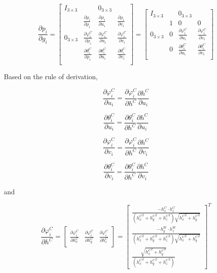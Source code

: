 \begin{equation}
\frac{\partial p_{i}}{\partial g_{i}}=\begin{bmatrix}
I_{3\times 3} & & 0_{3\times 3} & \\
 & \frac{\partial \rho_{i}}{\partial \rho_{i}} & 
\frac{\partial \rho_{i}}{\partial u_{i}} & 
\frac{\partial \rho _{i}}{\partial v_{i}}\\
0_{3\times 3} & \frac{\partial \varphi_{i}^{C}}{\partial \rho_{i}} & 
\frac{\partial \varphi_{i}^{C}}{\partial u_{i}} & 
\frac{\partial \varphi_{i}^{C}}{\partial v_{i}} \\
 & \frac{\partial \theta_{i}^{C}}{\partial \rho_{i}} & 
\frac{\partial \theta_{i}^{C}}{\partial u_{i}} & 
\frac{\partial \theta_{i}^{C}}{\partial v_{i}} \\
\end{bmatrix} = \begin{bmatrix}
I_{3\times 3} & & 0_{3\times 3} & \\
 & 1 & 0 & 0 \\
0_{3\times 3} & 0 & \frac{\partial \varphi _{i}^{C}}{\partial u_{i}} 
& \frac{\partial \varphi_{i}^{C}}{\partial v_{i}} \\
 & 0 & \frac{\partial \theta_{i}^{C}}{\partial u_{i}} & 
\frac{\partial \theta_{i}^{C}}{\partial v_{i}} \\
\end{bmatrix}
\end{equation}

Based on the rule of derivation, 

$$\frac{\partial \varphi_{i}^{C}}{\partial u_{i}}=\frac{\partial 
\varphi_{i}^{C}}{\partial h^{C}}\frac{\partial h^{C}}{\partial u_{i}}$$


$$\frac{\partial \theta _{i}^{C}}{\partial u_{i}}=\frac{\partial \theta 
_{i}^{C}}{\partial h^{C}}\frac{\partial h^{C}}{\partial u_{i}}$$


$$\frac{\partial \varphi _{i}^{C}}{\partial v_{i}}=\frac{\partial 
\varphi _{i}^{C}}{\partial h^{C}}\frac{\partial h^{C}}{\partial v_{i}}$$

$$\frac{\partial \theta _{i}^{C}}{\partial v_{i}}=\frac{\partial \theta 
_{i}^{C}}{\partial h^{C}}\frac{\partial h^{C}}{\partial v_{i}}$$


\noindent and

\begin{equation}
\frac{\partial \varphi_{i}^{C}}{\partial h^{C}}= 
\begin{bmatrix}
\frac{\partial \varphi_{i}^{C}}{\partial h_{x}^{C}} & 
\frac{\partial \varphi_{i}^{C}}{\partial h_{y}^{C}} & 
\frac{\partial \varphi_{i}^{C}}{\partial h_{z}^{C}}
\end{bmatrix}=\begin{bmatrix}
\frac{-h_{x}^{C}\cdot h_{z}^{C}}{({h_{x}^{C}}^{2}+{h_{y}^{C}}^{2}+{h_{z}^{C}}^{2})\sqrt{{h_{x}^{C}}^{2}+{h_{y}^{C}}^{2}}} \\
\frac{-h_{y}^{W}\cdot h_{z}^{W}}{({h_{x}^{C}}^{2}+{h_{y}^{C}}^{2}+{h_{z}^{C}}^{2})\sqrt{{h_{x}^{C}}^{2}+{h_{y}^{C}}^{2}}} \\
\frac{\sqrt{{h_{x}^{C}}^{2}+{h_{y}^{C}}^{2}}}{({h_{x}^{C}}^{2}+{h_{y}^{C}}^{2}+{h_{z}^{C}}^{2})}
\end{bmatrix}^{T}
\end{equation}

